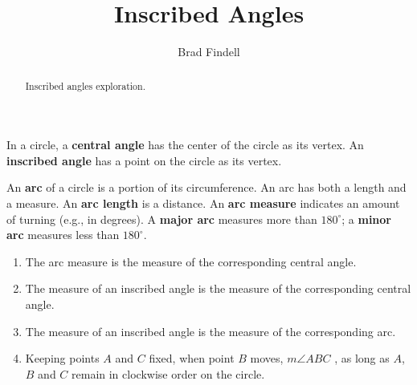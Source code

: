 \documentclass[handout,nooutcomes]{ximera}
\title{Inscribed Angles}
\author{Brad Findell}
\begin{document}
\begin{abstract}
Inscribed angles exploration. 
\end{abstract}
\maketitle


\begin{definition}
In a circle, a \textbf{central angle} has the center of the circle as its vertex.  
An \textbf{inscribed angle} has a point on the circle as its vertex. 
\end{definition}

\begin{definition}
An \textbf{arc} of a circle is a portion of its circumference.  An arc has both a length and a measure.  An \textbf{arc length} is a distance.  An \textbf{arc measure} indicates an amount of turning (e.g., in degrees).  A \textbf{major arc} measures more than $180^\circ$; a \textbf{minor arc} measures less than $180^\circ$.    
\end{definition}

\begin{center}  
\end{center}

\begin{problem}

\begin{enumerate}

\item The arc measure is  the measure of the corresponding central angle. 
\item The measure of an inscribed angle is  the measure of the corresponding central angle. 
\item The measure of an inscribed angle is  the measure of the corresponding arc. 
\item Keeping points $A$ and $C$ fixed, when point $B$ moves, $m\angle ABC$ , as long as $A$, $B$ and $C$ remain in clockwise order on the circle.  

\end{enumerate}
\end{problem}


\end{document}
